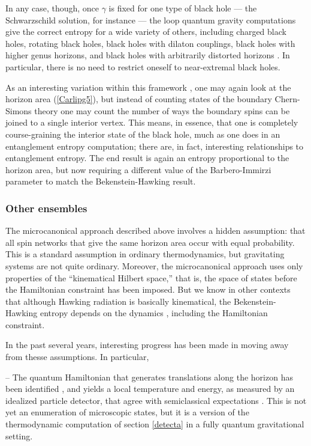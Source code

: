 \documentclass[11pt]{article}
\begin{document}
In any case, though, once $\gamma$ is fixed for one type of black
hole --- the Schwarzschild solution, for instance --- the loop 
quantum gravity computations give the correct entropy for a wide 
variety of others, including charged black holes, rotating black holes, 
black holes with dilaton couplings, black holes with higher genus 
horizons, and black holes with arbitrarily distorted horizons 
\cite{AshtekarLew,Engle}.  In particular, there is no need 
to restrict oneself to near-extremal black holes.  

As an interesting variation within this framework \cite{Livine}, 
one may again look at the horizon area (\ref{Carlipg5}), but instead 
of counting states of the boundary Chern-Simons theory one may 
count the number of ways the boundary spins can 
be joined to a single interior vertex.  This means, in essence, that 
one is completely course-graining the interior state of the black
hole, much as one does in an entanglement entropy computation; 
there are, in fact, interesting relationships to entanglement
entropy.  The end result is again an entropy proportional to 
the horizon area, but now requiring a different value of the 
Barbero-Immirzi parameter to match the Bekenstein-Hawking 
result.

\subsubsection{Other ensembles}

The microcanonical approach described above involves a hidden
assumption: that all spin networks that give the same horizon area
occur with equal probability.  This is a standard assumption in
ordinary thermodynamics, but gravitating systems are not quite
ordinary.  Moreover, the microcanonical approach uses only
properties of the ``kinematical Hilbert space,''  that is, the space
of states before the Hamiltonian constraint has been imposed.
But we know in other contexts that although Hawking radiation is
basically kinematical, the Bekenstein-Hawking entropy depends
on the dynamics \cite{Visser_essential}, including the Hamiltonian 
constraint.

In the past several years, interesting progress has been made in
moving away from thesse assumptions.  In particular,

-- The quantum Hamiltonian that generates translations along the
horizon has been identified \cite{Bianchi}, and yields 
a local temperature and energy, as measured by an idealized
particle detector, that agree with semiclassical expectations \cite{Frodden}.  
This is not yet an enumeration of microscopic states, but it is a version
of the thermodynamic computation of section \ref{detecta} in a
fully quantum gravitational setting.
\end{document}
